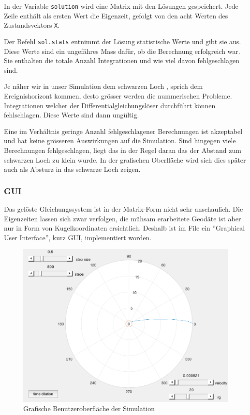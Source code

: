 \begin{refsection}
    In der Variable \texttt{solution} wird eine Matrix mit den Lösungen gespeichert. Jede Zeile enthält als ersten Wert die Eigenzeit, gefolgt von den acht Werten des Zustandsvektors \texttt{X}.
    
    Der Befehl \texttt{sol.stats} entnimmt der Lösung statistische Werte und gibt sie aus. Diese Werte sind ein ungefähres Mass dafür, ob die Berechnung erfolgreich war. Sie enthalten die totale Anzahl Integrationen und wie viel davon fehlgeschlagen sind.
    
    Je näher wir in unser Simulation dem schwarzen Loch , sprich dem Ereignishorizont kommen, desto grösser werden die nummerischen Probleme. Integrationen welcher der Differentialgleichungslöser durchführt können fehlschlagen. Diese Werte sind dann ungültig.
    
    Eine im Verhältnis geringe Anzahl fehlgeschlagener Berechnungen ist akzeptabel und hat keine grösseren Auswirkungen auf die Simulation. Sind hingegen viele Berechnungen fehlgeschlagen, liegt das in der Regel daran das der Abstand zum schwarzen Loch zu klein wurde. In der grafischen Oberfläche wird sich dies später auch als Absturz in das schwarze Loch zeigen.
    
    \subsubsection{GUI}
    Das gelöste Gleichungssystem ist in der Matrix-Form nicht sehr anschaulich. Die Eigenzeiten lassen sich zwar verfolgen, die mühsam erarbeitete Geodäte ist aber nur in Form von Kugelkoordinaten ersichtlich. Deshalb ist im File  ein ''Graphical User Interface'', kurz GUI, implementiert worden. 
    \begin{figure}[H]
        \centering
        \includegraphics[width=12cm]{zeitreisen/gui.png}
        \caption{Grafische Benutzeroberfläche der Simulation}
        \label{skript:zeitreisen:fig:gui} 
    \end{figure}
    

\end{refsection}
